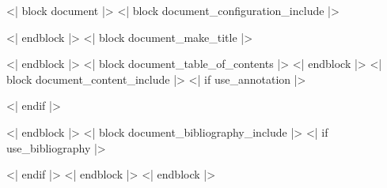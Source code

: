 \documentclass[<< document_class_args >>]{<< document_class >>}
\begin{document}
<| block document |>
<| block document_configuration_include |>
  
<| endblock |>
<| block document_make_title |>
  \maketitle
<| endblock |>
<| block document_table_of_contents |>
  {
    \singlespacing
    \tableofcontents
  }
<| endblock |>
<| block document_content_include |>
  \pagestyle{plain}
  <| if use_annotation |>
  
  <| endif |>
  
<| endblock |>
<| block document_bibliography_include |>
  <| if use_bibliography |>
  \nocite{*}

  \Bibliography
  <| endif |>
<| endblock |>
<| endblock |>
\end{document}
